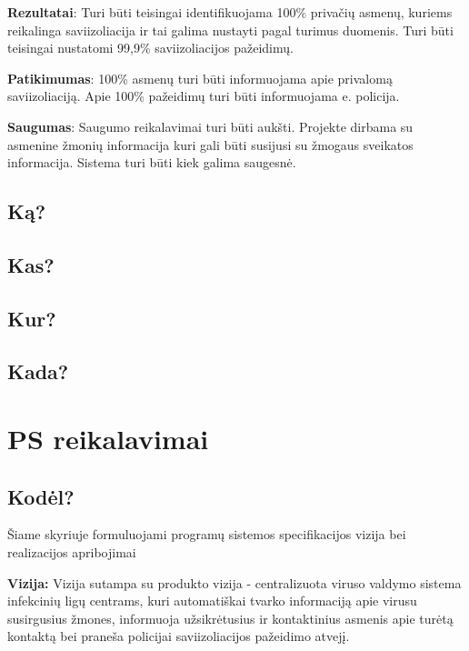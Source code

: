\documentclass{VUMIFPSkursinis}
\begin{document}
\textbf{Rezultatai}:
Turi būti teisingai identifikuojama 100\% privačių asmenų, kuriems reikalinga saviizoliacija ir tai galima nustayti pagal turimus duomenis. 
Turi būti teisingai nustatomi 99,9\% saviizoliacijos pažeidimų.

\textbf{Patikimumas}:
100\% asmenų turi būti informuojama apie privalomą saviizoliaciją. Apie 100\% pažeidimų turi būti informuojama e. policija.

\textbf{Saugumas}:
Saugumo reikalavimai turi būti aukšti. Projekte dirbama su asmenine žmonių informacija kuri gali būti susijusi su žmogaus sveikatos informacija. Sistema turi būti kiek galima saugesnė.

\subsection{Ką?}
\subsection{Kas?}
\subsection{Kur?}
\subsection{Kada?}

\section{PS reikalavimai}
 
\subsection{Kodėl?}
Šiame skyriuje formuluojami programų sistemos specifikacijos vizija bei realizacijos apribojimai

\textbf{Vizija:} Vizija sutampa su produkto vizija - centralizuota viruso valdymo sistema infekcinių ligų centrams, kuri automatiškai tvarko informaciją apie virusu susirgusius žmones, informuoja užsikrėtusius ir kontaktinius asmenis apie turėtą kontaktą bei praneša policijai saviizoliacijos pažeidimo atvejį.
\end{document}
